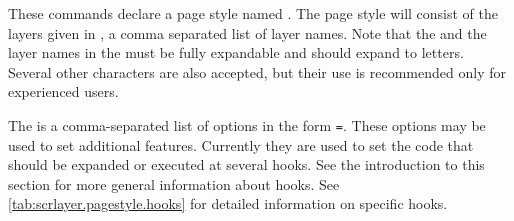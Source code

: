 \begin{Declaration}
\end{Declaration}
%
%
These commands declare a page style named . The page
style will consist of the layers given in , a comma
separated list of layer names. Note that the  and the layer names in the  must be fully
expandable and should expand to letters. Several other characters are also
accepted, but their use is recommended only for experienced users.

The  is a comma-separated list of options in the form
\texttt{=}. These options may be used to set
additional features. Currently they are used to set the code that should be
expanded or executed at several hooks. See the introduction to
this section for more general information about hooks. See
\autoref{tab:scrlayer.pagestyle.hooks} for detailed information on specific
hooks.

